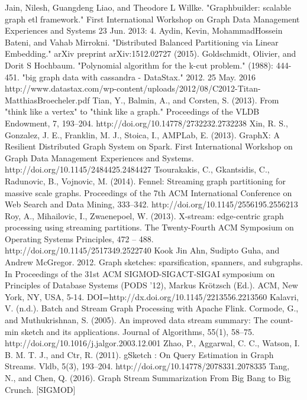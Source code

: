 \documentclass[conference]{IEEEtran}
\begin{document}
\begin{thebibliography}{1}
   Jain, Nilesh, Guangdeng Liao, and Theodore L Willke. "Graphbuilder: scalable graph etl framework." First International Workshop on Graph Data Management Experiences and Systems 23 Jun. 2013: 4.
   Aydin, Kevin, MohammadHossein Bateni, and Vahab Mirrokni. "Distributed Balanced Partitioning via Linear Embedding." arXiv preprint arXiv:1512.02727 (2015).
   Goldschmidt, Olivier, and Dorit S Hochbaum. "Polynomial algorithm for the k-cut problem." (1988): 444-451.
   "big graph data with cassandra - DataStax." 2012. 25 May. 2016 http://www.datastax.com/wp-content/uploads/2012/08/C2012-Titan-MatthiasBroecheler.pdf
   Tian, Y., Balmin, A., and Corsten, S. (2013). From "think like a vertex" to "think like a graph." Proceedings of the VLDB Endowment, 7, 193–204. http://doi.org/10.14778/2732232.2732238
   Xin, R. S., Gonzalez, J. E., Franklin, M. J., Stoica, I.,  AMPLab, E. (2013). GraphX: A Resilient Distributed Graph System on Spark. First International Workshop on Graph Data Management Experiences and Systems. http://doi.org/10.1145/2484425.2484427
   Tsourakakis, C., Gkantsidis, C., Radunovic, B.,  Vojnovic, M. (2014). Fennel: Streaming graph partitioning for massive scale graphs. Proceedings of the 7th ACM International Conference on Web Search and Data Mining, 333–342. http://doi.org/10.1145/2556195.2556213
   Roy, A., Mihailovic, I.,  Zwaenepoel, W. (2013). X-stream: edge-centric graph processing using streaming partitions. The Twenty-Fourth ACM Symposium on Operating Systems Principles, 472 – 488. http://doi.org/10.1145/2517349.2522740
  Kook Jin Ahn, Sudipto Guha, and Andrew McGregor. 2012. Graph sketches: sparsification, spanners, and subgraphs. In Proceedings of the 31st ACM SIGMOD-SIGACT-SIGAI symposium on Principles of Database Systems (PODS '12), Markus Krötzsch (Ed.). ACM, New York, NY, USA, 5-14. DOI=http://dx.doi.org/10.1145/2213556.2213560
   Kalavri, V. (n.d.). Batch and Stream Graph Processing with Apache Flink.
   Cormode, G., and Muthukrishnan, S. (2005). An improved data stream summary: The count-min sketch and its applications. Journal of Algorithms, 55(1), 58–75. http://doi.org/10.1016/j.jalgor.2003.12.001
   Zhao, P., Aggarwal, C. C., Watson, I. B. M. T. J., and Ctr, R. (2011). gSketch : On Query Estimation in Graph Streams. Vldb, 5(3), 193–204. http://doi.org/10.14778/2078331.2078335
   Tang, N., and Chen, Q. (2016). Graph Stream Summarization From Big Bang to Big Crunch. [SIGMOD]

\end{thebibliography}
\end{document}

